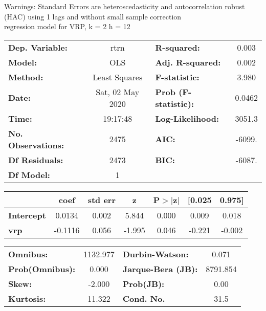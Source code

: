 Warnings: \newline
 [1] Standard Errors are heteroscedasticity and autocorrelation robust (HAC) using 1 lags and without small sample correction\\ 

regression model for VRP, k = 2 h = 12\begin{center}
\begin{tabular}{lclc}
\toprule
\textbf{Dep. Variable:}    &       rtrn       & \textbf{  R-squared:         } &     0.003   \\
\textbf{Model:}            &       OLS        & \textbf{  Adj. R-squared:    } &     0.002   \\
\textbf{Method:}           &  Least Squares   & \textbf{  F-statistic:       } &     3.980   \\
\textbf{Date:}             & Sat, 02 May 2020 & \textbf{  Prob (F-statistic):} &   0.0462    \\
\textbf{Time:}             &     19:17:48     & \textbf{  Log-Likelihood:    } &    3051.3   \\
\textbf{No. Observations:} &        2475      & \textbf{  AIC:               } &    -6099.   \\
\textbf{Df Residuals:}     &        2473      & \textbf{  BIC:               } &    -6087.   \\
\textbf{Df Model:}         &           1      & \textbf{                     } &             \\
\bottomrule
\end{tabular}
\begin{tabular}{lcccccc}
                   & \textbf{coef} & \textbf{std err} & \textbf{z} & \textbf{P$> |$z$|$} & \textbf{[0.025} & \textbf{0.975]}  \\
\midrule
\textbf{Intercept} &       0.0134  &        0.002     &     5.844  &         0.000        &        0.009    &        0.018     \\
\textbf{vrp}       &      -0.1116  &        0.056     &    -1.995  &         0.046        &       -0.221    &       -0.002     \\
\bottomrule
\end{tabular}
\begin{tabular}{lclc}
\textbf{Omnibus:}       & 1132.977 & \textbf{  Durbin-Watson:     } &    0.071  \\
\textbf{Prob(Omnibus):} &   0.000  & \textbf{  Jarque-Bera (JB):  } & 8791.854  \\
\textbf{Skew:}          &  -2.000  & \textbf{  Prob(JB):          } &     0.00  \\
\textbf{Kurtosis:}      &  11.322  & \textbf{  Cond. No.          } &     31.5  \\
\bottomrule
\end{tabular}
\end{center}

